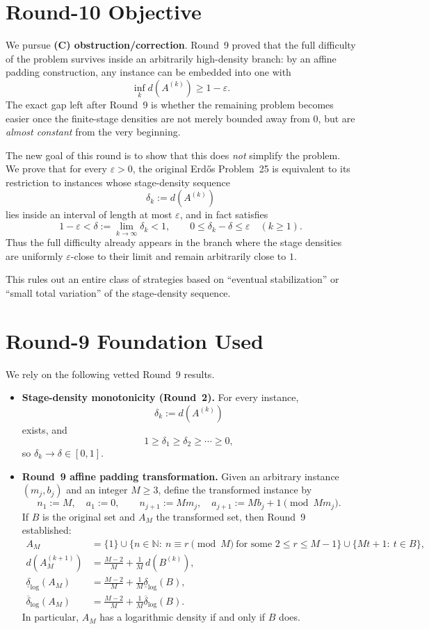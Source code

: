 \section{Round-10 Objective}
We pursue \textbf{(C) obstruction/correction}.  Round~9 proved that the full difficulty of the problem survives inside an arbitrarily high-density branch: by an affine padding construction, any instance can be embedded into one with
\[
\inf_k d(A^{(k)})\ge 1-\varepsilon.
\]
The exact gap left after Round~9 is whether the remaining problem becomes easier once the finite-stage densities are not merely bounded away from $0$, but are \emph{almost constant} from the very beginning.

The new goal of this round is to show that this does \emph{not} simplify the problem.  We prove that for every $\varepsilon>0$, the original Erd\H{o}s Problem~25 is equivalent to its restriction to instances whose stage-density sequence
\[
\delta_k:=d(A^{(k)})
\]
lies inside an interval of length at most $\varepsilon$, and in fact satisfies
\[
1-\varepsilon<\delta:=\lim_{k\to\infty}\delta_k<1,
\qquad
0\le \delta_k-\delta\le \varepsilon\quad (k\ge 1).
\]
Thus the full difficulty already appears in the branch where the stage densities are uniformly $\varepsilon$-close to their limit and remain arbitrarily close to $1$.

This rules out an entire class of strategies based on ``eventual stabilization'' or ``small total variation'' of the stage-density sequence.

\section{Round-9 Foundation Used}
We rely on the following vetted Round~9 results.
\begin{itemize}
\item \textbf{Stage-density monotonicity (Round~2).}
For every instance,
\[
\delta_k:=d(A^{(k)})
\]
exists, and
\[
1\ge \delta_1\ge \delta_2\ge \cdots\ge 0,
\]
so $\delta_k\to\delta\in[0,1]$.

\item \textbf{Round~9 affine padding transformation.}
Given an arbitrary instance $(m_j,b_j)$ and an integer $M\ge 3$, define the transformed instance by
\[
 n_1:=M,\quad a_1:=0,
 \qquad
 n_{j+1}:=Mm_j,\quad a_{j+1}:=Mb_j+1\pmod{Mm_j}.
\]
If $B$ is the original set and $A_M$ the transformed set, then Round~9 established:
\begin{align}
A_M
&=
\{1\}
\cup
\{n\in\mathbb N:\ n\equiv r\pmod M\ \text{for some }2\le r\le M-1\}
\cup
\{Mt+1:\ t\in B\},
\tag{R9.1}\\
 d(A_M^{(k+1)})
&=
\frac{M-2}{M}+\frac1M\,d(B^{(k)}),
\tag{R9.2}\\
\underline{\delta}_{\log}(A_M)
&=
\frac{M-2}{M}+\frac1M\underline{\delta}_{\log}(B),
\tag{R9.3}\\
\overline{\delta}_{\log}(A_M)
&=
\frac{M-2}{M}+\frac1M\overline{\delta}_{\log}(B).
\tag{R9.4}
\end{align}
In particular, $A_M$ has a logarithmic density if and only if $B$ does.
\end{itemize}

